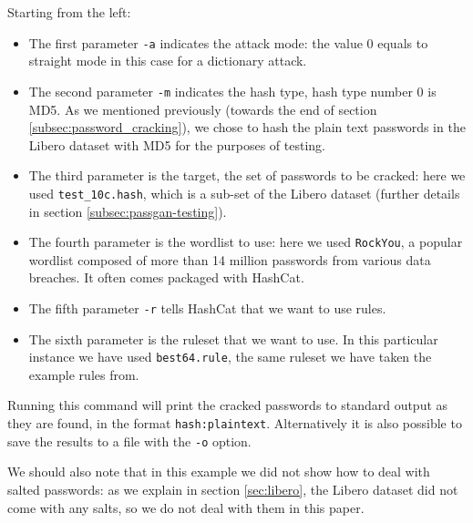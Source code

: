 Starting from the left:
\begin{itemize}
\item The first parameter \texttt{-a} indicates the attack mode: the value 0 equals to straight mode in this case for a dictionary attack.

\item The second parameter \texttt{-m} indicates the hash type, hash type number 0 is MD5. As we mentioned previously (towards the end of section \ref{subsec:password_cracking}), we chose to hash the plain text passwords in the Libero dataset with MD5 for the purposes of testing.

\item The third parameter is the target, the set of passwords to be cracked: here we used \texttt{test\_10c.hash}, which is a sub-set of the Libero dataset (further details in section \ref{subsec:passgan-testing}).

\item The fourth parameter is the wordlist to use: here we used \texttt{RockYou}, a popular wordlist composed of more than 14 million passwords from various data breaches. It often comes packaged with HashCat.

\item The fifth parameter \texttt{-r} tells HashCat that we want to use rules.

\item The sixth parameter is the ruleset that we want to use. In this particular instance we have used \texttt{best64.rule}, the same ruleset we have taken the example rules from.    
\end{itemize}

Running this command will print the cracked passwords to standard output as they are found, in the format \texttt{hash:plaintext}. Alternatively it is also possible to save the results to a file with the \texttt{-o} option.

We should also note that in this example we did not show how to deal with salted passwords: as we explain in section \ref{sec:libero}, the Libero dataset did not come with any salts, so we do not deal with them in this paper.
